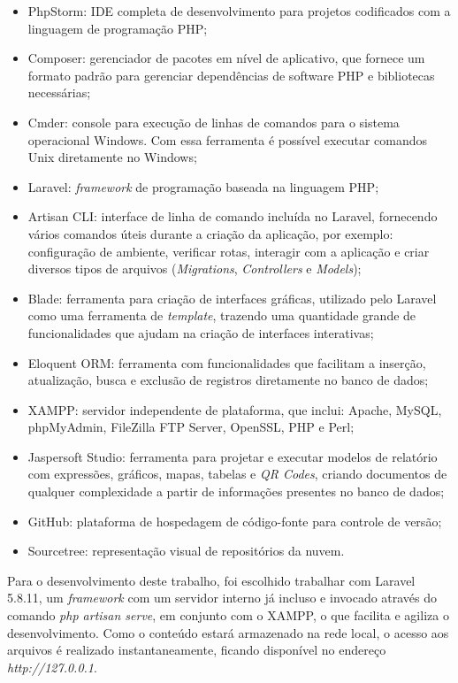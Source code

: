 \begin{itemize}
    \item PhpStorm: IDE completa de desenvolvimento para projetos codificados com a linguagem de programação PHP;
    \item Composer: gerenciador de pacotes em nível de aplicativo, que fornece um formato padrão para gerenciar dependências de software PHP e bibliotecas necessárias;
    \item Cmder: console para execução de linhas de comandos para o sistema operacional Windows. Com essa ferramenta é possível executar comandos Unix diretamente no Windows;
    \item Laravel: \textit{framework} de programação baseada na linguagem PHP;
    \item Artisan CLI: interface de linha de comando incluída no Laravel, fornecendo vários comandos úteis durante a criação da aplicação, por exemplo: configuração de ambiente, verificar rotas, interagir com a aplicação e criar diversos tipos de arquivos (\textit{Migrations}, \textit{Controllers} e \textit{Models});
    \item Blade: ferramenta para criação de interfaces gráficas, utilizado pelo Laravel como uma ferramenta de \textit{template}, trazendo uma quantidade grande de funcionalidades que ajudam na criação de interfaces interativas;
    \item Eloquent ORM: ferramenta com funcionalidades que facilitam a inserção, atualização, busca e exclusão de registros diretamente no banco de dados;
    \item XAMPP: servidor independente de plataforma, que inclui: Apache, MySQL, phpMyAdmin, FileZilla FTP Server, OpenSSL, PHP e Perl;
    \item Jaspersoft Studio: ferramenta para projetar e executar modelos de relatório com expressões, gráficos, mapas, tabelas e \textit{QR Codes}, criando documentos de qualquer complexidade a partir de informações presentes no banco de dados;
    \item GitHub: plataforma de hospedagem de código-fonte para controle de versão;
    \item Sourcetree: representação visual de repositórios da nuvem.
\end{itemize}

\newpage
Para o desenvolvimento deste trabalho, foi escolhido trabalhar com Laravel 5.8.11, um \textit{framework} com um servidor interno já incluso e invocado através do comando \textit{php artisan serve}, em conjunto com o XAMPP, o que facilita e agiliza o desenvolvimento. Como o conteúdo estará armazenado na rede local, o acesso aos arquivos é realizado instantaneamente, ficando disponível no endereço \textit{http://127.0.0.1}.

